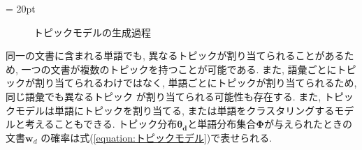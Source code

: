 \documentclass{ltjarticle}
\begin{document}
\newpage
\fboxsep = 20pt
\begin{figure}[h]
    \centering
    \caption{トピックモデルの生成過程}
    \label{fig:生成過程}
\end{figure}
\vspace{10truept}

同一の文書に含まれる単語でも, 異なるトピックが割り当てられることがあるため, 一つの文書が複数のトピックを持つことが可能である. 
また, 語彙ごとにトピックが割り当てられるわけではなく, 単語ごとにトピックが割り当てられるため, 同じ語彙でも異なるトピック
が割り当てられる可能性も存在する. 
また, トピックモデルは単語にトピックを割り当てる, または単語をクラスタリングするモデルと考えることもできる. 
トピック分布$\boldsymbol{\theta_d}$と単語分布集合$\boldsymbol{\Phi}$が与えられたときの文書$\boldsymbol{w}_d$
の確率は式(\ref{equation:トピックモデル})で表せられる.
\vspace{10truept}
\end{document}
